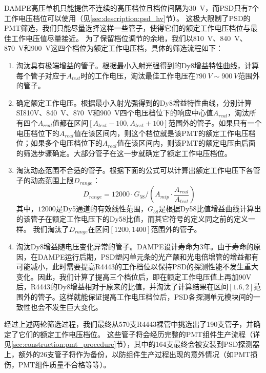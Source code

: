DAMPE高压单机只能提供不连续的高压档位且档位间隔为\SI{30}{V}，而PSD只有7个工作电压档位可以使用（见\ref{sec:description:psd_hv}节）。
这极大限制了PSD的PMT筛选，我们只能尽量选择这样一些管子，使得它们的额定工作电压档位与最佳工作电压值尽量接近。
为了保留档位调节的余地，我们以\SI{810}{V}、\SI{840}{V}、\SI{870}{V}和\SI{900}{V}这四个档位为额定工作电压档，具体的筛选流程如下：
\begin{enumerate}
	\item 淘汰具有极端增益的管子。根据最小入射光强得到的Dy8增益特性曲线，计算每个管子对应于$A_{test}$时的工作电压，淘汰最佳工作电压在$\SI{790}{V}\sim\SI{900}{V}$范围外的管子。
	\item 确定额定工作电压。根据最小入射光强得到的Dy8增益特性曲线，分别计算SI{810}{V}、\SI{840}{V}、\SI{870}{V}和\SI{900}{V}四个电压档位下的响应中心值$A_{real}$，淘汰所有四个$A_{real}$值都在区间$[A_{test}-100,A_{test}+100]$范围外的管子。如果只有一个电压档位下的$A_{real}$值在该区间内，则这个档位就是该PMT的额定工作电压档位；如果多个电压档位下的$A_{real}$值在该区间内，则该PMT的额定电压由后面的筛选步骤确定。大部分管子在这一步就确定了额定工作电压档位。
	\item 淘汰动态范围不合适的管子。根据下面的公式可以计算出额定工作电压下各管子的动态范围上限$D_{range}$：
	\begin{equation}
		D_{range} = 12000\cdot G_{58} / (A_{mip}\cdot \frac{A_{real}}{A_{test}})
		\label{eq:construction:dynamic_range}
	\end{equation}
	其中，$12000$是Dy5通道的有效线性范围，$G_{58}$是根据Dy58比值增益曲线计算出的该管子在额定工作电压下的Dy58比值，而其它符号的定义同之前的定义一样。
	我们淘汰了$D_{range}$在区间$[1200,1400]$范围外的管子。
	\item 淘汰Dy8增益随电压变化异常的管子。DAMPE设计寿命为3年。由于寿命的原因，在DAMPE运行后期，PSD塑闪单元条的光产额和光电倍增管的增益都有可能减小，此时需要提高R4443的工作档位以保持PSD的探测性能不发生重大变化。因此，我们计算了提高三个档位后，即在额定工作电压值上再加90V后，R4443的Dy8增益相对于原来的比值，并淘汰了计算结果在区间$[1.6,2]$范围外的管子。这样就能保证提高工作电压档位后，PSD各探测单元模块间的一致性也会不发生巨大变化。
\end{enumerate}

经过上述两轮筛选过程，我们最终从570支R4443裸管中挑选出了190支管子，并确定了它们的额定工作电压档位。
这些管子将会经历完整的PMT组件生产流程（详见\ref{sec:construction:pmt_procedure}节），其中的164支最终会被安装到PSD探测器上，额外的26支管子将作为备份，以防组件生产过程出现的意外情况（如PMT损伤，PMT组件质量不合格等等）。


